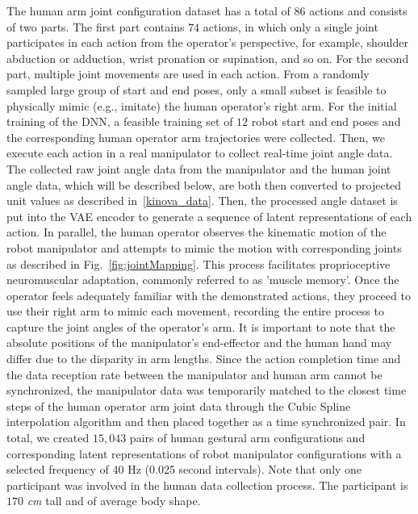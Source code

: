 The human arm joint configuration dataset has a total of $86$ actions and consists of two parts. The first part contains $74$ actions, in which only a single joint participates in each action from the operator's perspective, for example, shoulder abduction or adduction, wrist pronation or supination, and so on. For the second part, multiple joint movements are used in each action. From a randomly sampled large group of start and end poses, only a small subset is feasible to physically mimic (e.g., imitate) the human operator's right arm. For the initial training of the DNN, a feasible training set of $12$ robot start and end poses and the corresponding human operator arm trajectories were collected. Then, we execute each action in a real manipulator to collect real-time joint angle data. The collected raw joint angle data from the manipulator and the human joint angle data, which will be described below, are both then converted to projected unit values as described in~\ref{kinova_data}. Then, the processed angle dataset is put into the VAE encoder to generate a sequence of latent representations of each action. In parallel, the human operator observes the kinematic motion of the robot manipulator and attempts to mimic the motion with corresponding joints as described in Fig.~\ref{fig:jointMapping}. This process facilitates proprioceptive neuromuscular adaptation, commonly referred to as 'muscle memory'. Once the operator feels adequately familiar with the demonstrated actions, they proceed to use their right arm to mimic each movement, recording the entire process to capture the joint angles of the operator's arm. It is important to note that the absolute positions of the manipulator's end-effector and the human hand may differ due to the disparity in arm lengths. Since the action completion time and the data reception rate between the manipulator and human arm cannot be synchronized, the manipulator data was temporarily matched to the closest time steps of the human operator arm joint data through the Cubic Spline interpolation algorithm and then placed together as a time synchronized pair. In total, we created $15,043$  pairs of human gestural arm configurations and corresponding latent representations of robot manipulator configurations with a selected frequency of 40 Hz (0.025 second intervals). Note that only one participant was involved in the human data collection process. The participant is $170$ \textit{cm} tall and of average body shape.
\vspace{-2.2mm}
